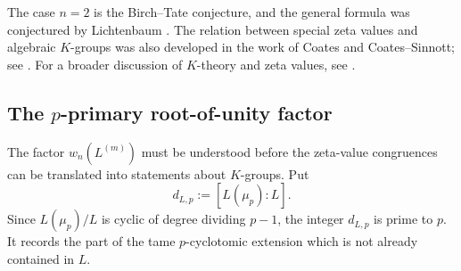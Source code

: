 \documentclass[11pt,table]{amsart}
\numberwithin{equation}{section}
\begin{document}
\par The case \(n=2\) is the Birch--Tate conjecture, and the general
formula was conjectured by Lichtenbaum
\cite{Lichtenbaum1972,Lichtenbaum1973}.  The relation between special
zeta values and algebraic $K$-groups was also developed in the work of
Coates and Coates--Sinnott; see \cite{CoatesK2,CoatesSinnott}.  For a
broader discussion of $K$-theory and zeta values, see
\cite{SouleKTheory}.

\subsection{The \(p\)-primary root-of-unity factor}
\label{subsec:p-primary-w-factor}

\par The factor \(w_n(L^{(m)})\) must be understood before the
zeta-value congruences can be translated into statements about
\(K\)-groups. Put
\begin{equation}
        d_{L,p}
        :=
        [L(\mu_p):L].
        \label{eq:def-dLp}
\end{equation}
Since \(L(\mu_p)/L\) is cyclic of degree dividing \(p-1\), the integer
\(d_{L,p}\) is prime to \(p\).  It records the part of the tame
\(p\)-cyclotomic extension which is not already contained in \(L\).
\end{document}
